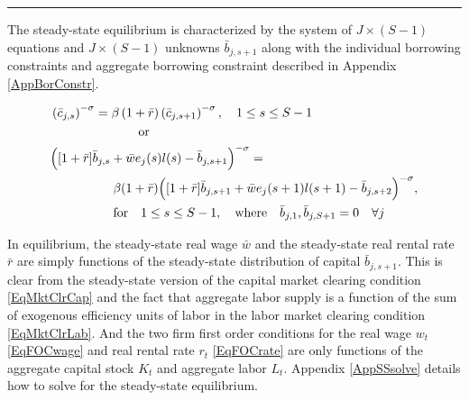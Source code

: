 \documentclass[letterpaper,12pt]{article}
\theoremstyle{definition}
\begin{document}
    \hrule
    \begin{spacing}{1.5}
    \vspace{10mm}

    The steady-state equilibrium is characterized by the system of $J\times(S-1)$ equations and $J\times(S-1)$ unknowns $\bar{b}_{j,s+1}$ along with the individual borrowing constraints and aggregate borrowing constraint described in Appendix \ref{AppBorConstr}.

    \begin{equation}\label{EqSSeuler}
      \begin{split}
        &\left(\bar{c}_{j,s}\right)^{-\sigma} = \beta \left(1+\bar{r}\right)\left(\bar{c}_{j,s+1}\right)^{-\sigma}, \quad 1\leq s\leq S-1 \\
        &\quad\quad\quad\quad\quad\quad\quad\text{or} \\
        &\Bigl([1+\bar{r}]\bar{b}_{j,s} + \bar{w}e_j(s)l(s) - \bar{b}_{j,s+1}\Bigr)^{-\sigma} = \\
        &\quad\quad\quad\quad\quad \beta(1+\bar{r})\Bigl([1+\bar{r}]\bar{b}_{j,s+1} + \bar{w}e_j(s+1)l(s+1) - \bar{b}_{j,s+2}\Bigr)^{-\sigma}, \\
        &\quad\quad\quad\quad\quad \text{for} \quad 1\leq s\leq S-1,\quad\text{where}\quad \bar{b}_{j,1},\bar{b}_{j,S+1} = 0 \quad\forall j
      \end{split}
    \end{equation}

    In equilibrium, the steady-state real wage $\bar{w}$ and the steady-state real rental rate $\bar{r}$ are simply functions of the steady-state distribution of capital $\bar{b}_{j,s+1}$. This is clear from the steady-state version of the capital market clearing condition \eqref{EqMktClrCap} and the fact that aggregate labor supply is a function of the sum of exogenous efficiency units of labor in the labor market clearing condition \eqref{EqMktClrLab}. And the two firm first order conditions for the real wage $w_t$ \eqref{EqFOCwage} and real rental rate $r_t$ \eqref{EqFOCrate} are only functions of the aggregate capital stock $K_t$ and aggregate labor $L_t$. Appendix \ref{AppSSsolve} details how to solve for the steady-state equilibrium.



\end{spacing}
\end{document}
